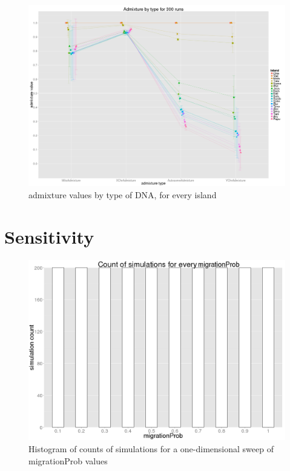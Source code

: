 \documentclass[a4paper,12pt]{report}
\begin{document}
\begin{figure}[!htbp]
	\centering
	\includegraphics[scale=0.22]{../data/stability-admixGradient.png}
	\caption{admixture values by type of DNA, for every island}
	\label{app:stability-admixGradient}
\end{figure}

\section{Sensitivity}
\begin{figure}[!htbp]
	\centering
	\includegraphics[scale=0.3]{../data/count-1d.png}
	\caption{Histogram of counts of simulations for a one-dimensional sweep of migrationProb values}
	\label{app:count-1d}
\end{figure}
\end{document}
